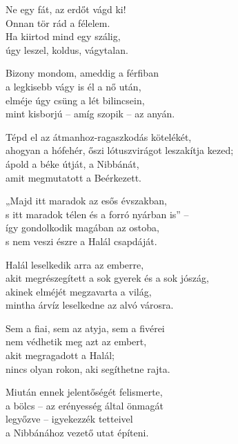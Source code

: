 \begin{dhpverse}

 Ne egy fát, az erdőt vágd ki!\\
Onnan tör rád a félelem.\\
Ha kiirtod mind egy szálig,\\
úgy leszel, koldus, vágytalan.

 Bizony mondom, ameddig a férfiban\\
a legkisebb vágy is él a nő után,\\
elméje úgy csüng a lét bilincsein,\\
mint kisborjú – amíg szopik – az anyán.

 Tépd el az átmanhoz-ragaszkodás kötelékét,\\
ahogyan a hófehér, őszi lótuszvirágot leszakítja kezed;\\
ápold a béke útját, a Nibbánát,\\
amit megmutatott a Beérkezett.

 „Majd itt maradok az esős évszakban,\\
s itt maradok télen és a forró nyárban is” –\\
így gondolkodik magában az ostoba,\\
s nem veszi észre a Halál csapdáját.

 Halál leselkedik arra az emberre,\\
akit megrészegített a sok gyerek és a sok jószág,\\
akinek elméjét megzavarta a világ,\\
mintha árvíz leselkedne az alvó városra.

 Sem a fiai, sem az atyja, sem a fivérei\\
nem védhetik meg azt az embert,\\
akit megragadott a Halál;\\
nincs olyan rokon, aki segíthetne rajta.

\end{dhpverse}
\newpage
\begin{dhpverse}

 Miután ennek jelentőségét felismerte,\\
a bölcs  – az erényesség által önmagát\\
legyőzve – igyekezzék tetteivel\\
a Nibbánához vezető utat építeni.

\end{dhpverse}
